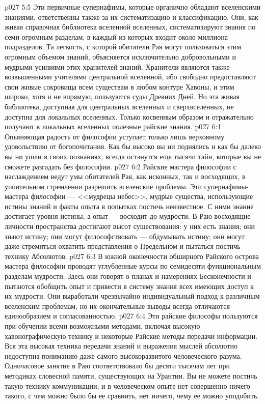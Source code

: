 \vs p027 5:5 Эти первичные супернафимы, которые органично обладают вселенскими знаниями, ответственны также за их систематизацию и классификацию. Они, как живая справочная библиотека вселенной вселенных, систематизируют знания по семи огромным разделам, в каждый из которых входит около миллиона подразделов. Та легкость, с которой обитатели Рая могут пользоваться этим огромным объемом знаний, объясняется исключительно добровольными и мудрыми усилиями этих хранителей знаний. Хранители являются также возвышенными учителями центральной вселенной, ибо свободно предоставляют свои живые сокровища всем существам в любом контуре Хавоны, и этим широко, хотя и не впрямую, пользуются суды Древних Дней. Но эта живая библиотека, доступная для центральных вселенных и сверхвселенных, не доступна для локальных вселенных. Только косвенным образом и отражательно получают в локальных вселенных полезные райские знания.
\vs p027 6:1 Опьяняющая радость от философии уступает только лишь верховному удовольствию от богопочитания. Как бы высоко вы ни поднялись и как бы далеко вы ни ушли в своих познаниях, всегда останутся еще тысячи тайн, которые вы не сможете разгадать без философии.
\vs p027 6:2 Райские мастера философии с наслаждением ведут умы обитателей Рая, как исконных, так и восходящих, в упоительном стремлении разрешить вселенские проблемы. Эти супернафимы\hyp{}мастера философии --- <<мудрецы небес>>, мудрые существа, использующие истины знаний и факты опыта в попытках постичь неизвестное. С ними знание достигает уровня истины, а опыт --- восходит до мудрости. В Раю восходящие личности пространства достигают высот существования: у них есть знания; они знают истину; они могут философствовать --- обдумывать истину; они могут даже стремиться охватить представления о Предельном и пытаться постичь технику Абсолютов.
\vs p027 6:3 В южной оконечности обширного Райского острова мастера философии проводят углубленные курсы по семидесяти функциональным разделам мудрости. Здесь они говорят о планах и намерениях Бесконечности и пытаются обобщить опыт и привести в систему знания всех имеющих доступ к их мудрости. Они выработали чрезвычайно индивидуальный подход к различным вселенским проблемам, но их окончательные выводы всегда отличаются единообразием и согласованностью.
\vs p027 6:4 Эти райские философы пользуются при обучении всеми возможными методами, включая высокую хавонографическую технику и некоторые Райские методы передачи информации. Вся эта высокая техника передачи знаний и выражения мыслей абсолютно недоступна пониманию даже самого высокоразвитого человеческого разума. Одночасовое занятие в Раю соответствовало бы десяти тысячам лет при методиках словесной памяти, существующих на Урантии. Вы не можете постичь такую технику коммуникации, и в человеческом опыте нет совершенно ничего такого, с чем можно было бы ее сравнить, нет ничего, чему ее можно уподобить.
